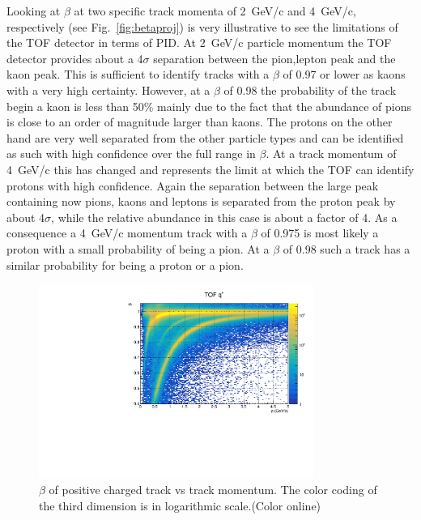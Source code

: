 Looking at $\beta$ at two specific track momenta of 2~GeV/c and 4~GeV/c, respectively (see Fig.~\ref{fig:betaproj}) is very illustrative to see the limitations
of the TOF detector in terms of PID. At 2~GeV/c particle momentum the TOF detector provides about a 4$\sigma$ separation between
the pion,lepton peak and the kaon peak. This is sufficient to identify tracks with a $\beta$ of 0.97 or lower as kaons with a very
high certainty. However, at a $\beta$ of 0.98 the probability of the track begin a kaon is less than 50\% mainly due to the fact
that the abundance of pions is close to an order of magnitude larger than kaons. The protons on the other hand are very well
separated from the other particle types and can be identified as such with high confidence over the full range in $\beta$.
At a track momentum of 4~GeV/c this has changed and represents the limit at which the TOF can identify protons with high confidence. Again the separation between the large peak containing now pions, kaons and leptons is separated from the proton
peak by about 4$\sigma$, while the relative abundance in this case is about a factor of 4. As a consequence a 4~GeV/c momentum
track with a $\beta$ of 0.975 is most likely a proton with a small probability of being a pion. At a $\beta$ of 0.98 such
a track has a similar probability for being a proton or a pion.
\begin{figure}[tbp]
\begin{center}
\includegraphics[width=0.8\textwidth]{figures/beta_vs_p_positivetracks.pdf}
\caption{\label{fig:betavsp}$\beta$ of positive charged track vs track momentum. The color coding of the third dimension
is in logarithmic scale.(Color online)}
\end{center}
\end{figure}

